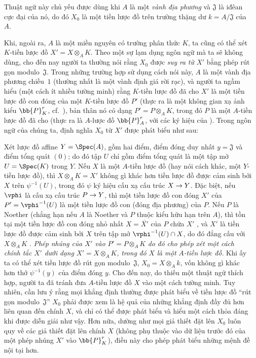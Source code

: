 \documentclass[oneside]{amsart}
\makeatletter
\newcommand{\ega@arrow}[2]{\mathchoice{#1}{#2}{#2}{#2}}
\renewcommand{\to}{\ega@arrow{\longrightarrow}{\rightarrow}}
\newcommand{\oldpage}[2][]{{\marginnote{\normalfont\textbf{#1}~|~#2}}\ignorespaces}
\let\EGAOriginalLabel\label
\renewcommand{\label}[1]{\phantomsection\EGAOriginalLabel{#1}}
\makeatother
\begin{document}
\begin{env}[3.7.2]
\label{I.3.7.2}
Thuật ngữ này chủ yếu được dùng khi $A$ là một \emph{vành địa phương} và $\mathfrak{J}$ là iđêan cực đại của nó, do đó $X_0$ là một tiền lược đồ trên trường thặng dư $k=A/\mathfrak{J}$ của $A$.

Khi, ngoài ra, $A$ là một miền nguyên có trường phân thức $K$, ta cũng có thể xét $K$-tiền lược đồ $X'=X\otimes_A K$.
Theo một sự lạm dụng ngôn ngữ mà ta sẽ không dùng, cho đến nay người ta thường nói rằng $X_0$ được \emph{suy ra từ $X'$} bằng phép rút gọn modulo~$\mathfrak{J}$.
Trong những trường hợp sử dụng cách nói này, $A$ là một vành địa phương chiều~$1$ (thường nhất là một vành định giá rời rạc), và người ta ngầm hiểu (một cách ít nhiều tường minh) rằng $K$-tiền lược đồ đã cho $X'$ là một tiền lược đồ con đóng của một $K$-tiền lược đồ $P'$ (thực ra là một không gian xạ ảnh kiểu $\bb{P}_K^r$, cf.~), bản thân nó có dạng $P'=P\otimes_A K$, trong đó $P$ là một $A$-tiền lược đồ đã cho (thực ra là $A$-lược đồ $\bb{P}_A^r$, với các ký hiệu của ).
Trong ngôn ngữ của chúng ta, định nghĩa $X_0$ từ $X'$ được phát biểu như sau:

Xét lược đồ affine $Y=\Spec(A)$, gồm hai điểm, điểm đóng duy nhất
\oldpage[I]{119}
$y=\mathfrak{J}$ và điểm tổng quát $(0)$; do đó tập $U$ chỉ gồm điểm tổng quát là một tập mở $U=\Spec(K)$ trong $Y$.
Nếu $X$ là một $A$-tiền lược đồ (hay nói cách khác, một $Y$-tiền lược đồ), thì $X\otimes_A K=X'$ không gì khác hơn tiền lược đồ được cảm sinh bởi $X$ trên $\psi^{-1}(U)$, trong đó $\psi$ ký hiệu cấu xạ cấu trúc $X\to Y$.
Đặc biệt, nếu $\vphi$ là cấu xạ cấu trúc $P\to Y$, thì một tiền lược đồ con đóng $X'$ của $P'=\vphi^{-1}(U)$ là một tiền lược đồ con (đóng địa phương) của $P$.
Nếu $P$ là Noether (chẳng hạn nếu $A$ là Noether và $P$ thuộc kiểu hữu hạn trên $A$), thì tồn tại một tiền lược đồ con đóng nhỏ nhất $X=\overline{X'}$ của $P$ chứa $X'$ , và $X'$ là tiền lược đồ được cảm sinh bởi $X$ trên tập mở $\vphi^{-1}(U)\cap X$, do đó đẳng cấu với $X\otimes_A K$ .
\emph{Phép nhúng của $X'$ vào $P'=P\otimes_A K$ do đó cho phép xét một cách chính tắc $X'$ dưới dạng $X'=X\otimes_A K$, trong đó $X$ là một $A$-tiền lược đồ.}
Khi ấy ta có thể xét tiền lược đồ rút gọn modulo~$\mathfrak{J}$, $X_0=X\otimes_A k$, vốn không gì khác hơn thớ $\psi^{-1}(y)$ của điểm đóng $y$.
Cho đến nay, do thiếu một thuật ngữ thích hợp, người ta đã tránh đưa $A$-tiền lược đồ $X$ vào một cách tường minh.
Tuy nhiên, cần lưu ý rằng mọi khẳng định thường được phát biểu về tiền lược đồ “rút gọn modulo~$\mathfrak{J}$” $X_0$ phải được xem là hệ quả của những khẳng định đầy đủ hơn liên quan đến chính $X$, và chỉ có thể được phát biểu và hiểu một cách thỏa đáng khi được diễn giải như vậy.
Hơn nữa, dường như mọi giả thiết đặt lên $X_0$ luôn quy về các giả thiết đặt lên chính $X$ (không phụ thuộc vào dữ liệu trước đó của một phép nhúng $X'$ vào $\bb{P}_K^r$), điều này cho phép phát biểu những mệnh đề nội tại hơn.
\end{env}
\end{document}
